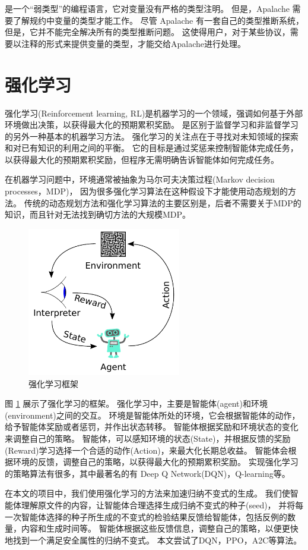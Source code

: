\TLA 是一个“弱类型”的编程语言，它对变量没有严格的类型注明。
但是，Apalache 需要了解\TLA 规约中变量的类型才能工作。
尽管 Apalache 有一套自己的类型推断系统，但是，它并不能完全解决所有的类型推断问题。
这使得用户，对于某些协议，需要以注释的形式来提供变量的类型，才能交给Apalache进行处理。


\section{强化学习}
强化学习(Reinforcement learning, RL)\cite{rl}是机器学习的一个领域，强调如何基于外部环境做出决策，以获得最大化的预期累积奖励。
是区别于监督学习和非监督学习的另外一种基本的机器学习方法。
强化学习的关注点在于寻找对未知领域的探索和对已有知识的利用之间的平衡。
它的目标是通过奖惩来控制智能体完成任务，以获得最大化的预期累积奖励，但程序无需明确告诉智能体如何完成任务。

在机器学习问题中，环境通常被抽象为马尔可夫决策过程(Markov decision processes，MDP)\cite{markov}，
因为很多强化学习算法在这种假设下才能使用动态规划的方法。
传统的动态规划方法和强化学习算法的主要区别是，后者不需要关于MDP的知识，而且针对无法找到确切方法的大规模MDP。

\begin{figure}[h]
    \centering
    \includegraphics[width=0.6\textwidth]{figures/Reinforcement_learning_diagram.pdf}
    \caption{强化学习框架}
    \label{fig:rl}
\end{figure}
图 \ref{fig:rl} 展示了强化学习的框架。
强化学习中，主要是智能体(agent)和环境(environment)之间的交互。
环境是智能体所处的环境，它会根据智能体的动作，给予智能体奖励或者惩罚，并作出状态转移。
智能体根据奖励和环境状态的变化来调整自己的策略。
智能体，可以感知环境的状态(State)，并根据反馈的奖励(Reward)学习选择一个合适的动作(Action)，来最大化长期总收益。
智能体会根据环境的反馈，调整自己的策略，以获得最大化的预期累积奖励。
实现强化学习的策略算法有很多，其中最著名的有 Deep Q Network(DQN)\cite{dqn}，Q-learning\cite{q-learning}等。

在本文的项目中，我们使用强化学习的方法来加速归纳不变式的生成。
我们使智能体理解\TLA 原文件的内容，让智能体合理选择生成归纳不变式的种子(seed)，
并将每一次智能体选择的种子所生成的不变式的检验结果反馈给智能体，包括反例的数量，内容和生成时间等。
智能体根据这些反馈信息，调整自己的策略，以便更快地找到一个满足安全属性的归纳不变式。
本文尝试了DQN，PPO，A2C等算法。


